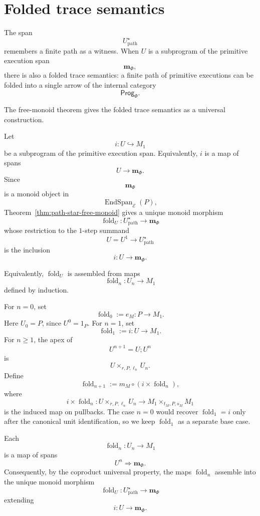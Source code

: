 \section{Folded trace semantics}
\label{sec:folded-trace-semantics}

The span
\[
U^\star_{\mathrm{path}}
\]
remembers a finite path as a witness. When \(U\) is a subprogram of the primitive execution span
\[
\mathbf m_\Phi,
\]
there is also a folded trace semantics: a finite path of primitive executions can be folded into a single arrow of the internal category
\[
\mathsf{Prog}_\Phi.
\]

The free-monoid theorem gives the folded trace semantics as a universal construction.

Let
\[
i:U\hookrightarrow M_1
\]
be a subprogram of the primitive execution span. Equivalently, \(i\) is a map of spans
\[
U\to\mathbf m_\Phi.
\]
Since
\[
\mathbf m_\Phi
\]
is a monoid object in
\[
\operatorname{EndSpan}_{\mathcal E}(P),
\]
Theorem~\ref{thm:path-star-free-monoid} gives a unique monoid morphism
\[
\operatorname{fold}_U:
U^\star_{\mathrm{path}}\to \mathbf m_\Phi
\]
whose restriction to the \(1\)-step summand
\[
U=U^1\to U^\star_{\mathrm{path}}
\]
is the inclusion
\[
i:U\to \mathbf m_\Phi.
\]

Equivalently, \(\operatorname{fold}_U\) is assembled from maps
\[
\operatorname{fold}_n:U_n\to M_1
\]
defined by induction.

For \(n=0\), set
\[
\operatorname{fold}_0:=e_M:P\to M_1.
\]
Here \(U_0=P\), since \(U^0=1_P\). For \(n=1\), set
\[
\operatorname{fold}_1:=i:U\to M_1.
\]
For \(n\ge1\), the apex of
\[
U^{n+1}=U;U^n
\]
is
\[
U\times_{r,P,\ell_n}U_n.
\]
Define
\[
\operatorname{fold}_{n+1}
:=
m_M\circ(i\times \operatorname{fold}_n),
\]
where
\[
i\times\operatorname{fold}_n:
U\times_{r,P,\ell_n}U_n
\to
M_1\times_{t_M,P,s_M}M_1
\]
is the induced map on pullbacks. The case \(n=0\) would recover \(\operatorname{fold}_1=i\) only after the canonical unit identification, so we keep \(\operatorname{fold}_1\) as a separate base case.

\begin{proposition}
\label{prop:fold-maps-are-span-maps}
Each
\[
\operatorname{fold}_n:U_n\to M_1
\]
is a map of spans
\[
U^n\Rightarrow\mathbf m_\Phi.
\]
Consequently, by the coproduct universal property, the maps \(\operatorname{fold}_n\) assemble into the unique monoid morphism
\[
\operatorname{fold}_U:
U^\star_{\mathrm{path}}\to \mathbf m_\Phi
\]
extending
\[
i:U\to\mathbf m_\Phi.
\]
\end{proposition}


